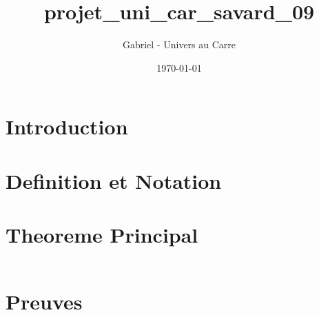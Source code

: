 \documentclass[12pt]{article}
\title{projet_uni_car_savard_09}
\author{Gabriel - Univers au Carre}
\date{\today}
\begin{document}
\maketitle


\section{Introduction}



\section{Definition et Notation}



\section{Theoreme Principal}


\begin{equation}
\end{equation}


\section{Preuves}


\end{document}

